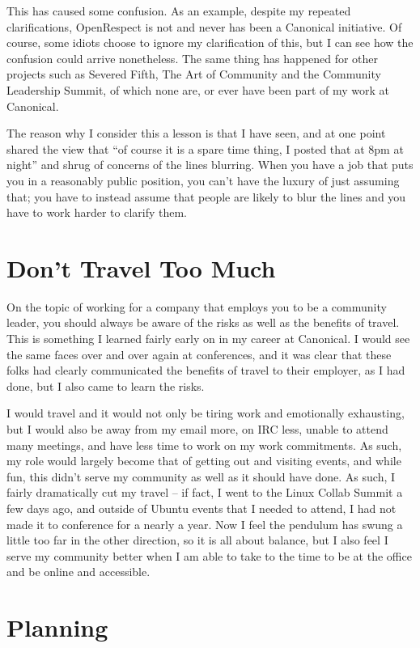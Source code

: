 This has caused some confusion. As an example, despite my repeated clarifications, OpenRespect is not and never has been a Canonical initiative. Of course, some idiots choose to ignore my clarification of this, but I can see how the confusion could arrive nonetheless. The same thing has happened for other projects such as Severed Fifth, The Art of Community and the Community Leadership Summit, of which none are, or ever have been part of my work at Canonical.

The reason why I consider this a lesson is that I have seen, and at one point shared the view that “of course it is a spare time thing, I posted that at 8pm at night” and shrug of concerns of the lines blurring. When you have a job that puts you in a reasonably public position, you can’t have the luxury of just assuming that; you have to instead assume that people are likely to blur the lines and you have to work harder to clarify them.

\section*{Don’t Travel Too Much}

On the topic of working for a company that employs you to be a community leader, you should always be aware of the risks as well as the benefits of travel. This is something I learned fairly early on in my career at Canonical. I would see the same faces over and over again at conferences, and it was clear that these folks had clearly communicated the benefits of travel to their employer, as I had done, but I also came to learn the risks.

I would travel and it would not only be tiring work and emotionally exhausting, but I would also be away from my email more, on IRC less, unable to attend many meetings, and have less time to work on my work commitments. As such, my role would largely become that of getting out and visiting events, and while fun, this didn’t serve my community as well as it should have done. As such, I fairly dramatically cut my travel – if fact, I went to the Linux Collab Summit a few days ago, and outside of Ubuntu events that I needed to attend, I had not made it to conference for a nearly a year. Now I feel the pendulum has swung a little too far in the other direction, so it is all about balance, but I also feel I serve my community better when I am able to take to the time to be at the office and be online and accessible.

\section*{Planning}

